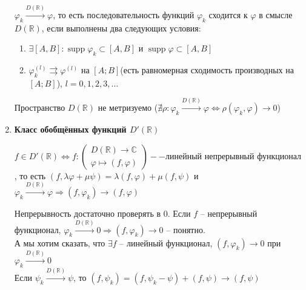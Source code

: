 \begin{enumerate}
    \begin{definition}
        $\varphi_k \overset{D(\mathbb{R})}{\longrightarrow} \varphi$, то есть последовательность функций $\varphi_k$ сходится к $\varphi$ в смысле $D(\mathbb{R})$, если выполнены два следующих условия: \begin{enumerate}
            \item $\exists [A, B]: \operatorname{supp} \varphi_k \subset [A, B]$ и $\operatorname{supp} \varphi \subset [A, B]$
            \item $\varphi_k^{(l)} \rightrightarrows \varphi^{(l)}$ на $[A;B]$(есть равномерная сходимость производных на $[A;B]$), $l = 0, 1, 2, 3, \dots$
        \end{enumerate}
    \end{definition}
    \begin{exercise}
        Пространство $D(\mathbb{R})$ не метризуемо ($\nexists \rho: \varphi_k \overset{D(\mathbb{R})}{\longrightarrow} \varphi \Leftrightarrow \rho(\varphi_k, \varphi) \to 0$)
    \end{exercise}
    \item \textbf{Класс обобщённых функций $D'(\mathbb{R})$}
        \begin{definition}
            $f \in D'(\mathbb{R}) \Leftrightarrow f:\begin{pmatrix}
            D(\mathbb{R}) \to \mathbb{C} \\ \varphi \mapsto (f, \varphi) 
            \end{pmatrix} -- \text{линейный непрерывный функционал }$, то есть $(f, \lambda \varphi + \mu \psi) = \lambda(f, \varphi) + \mu (f, \psi)$ и $\varphi_k \overset{D(\mathbb{R})}{\longrightarrow} \varphi \Longrightarrow (f, \varphi_k) \longrightarrow (f, \varphi)$
        \end{definition}
        \begin{warning}
            Непрерывность достаточно проверять в 0. Если $f$ -- непрерывный функционал, $\varphi_k \overset{D(\mathbb{R})}{\longrightarrow} 0 \Longrightarrow (f, \varphi_k) \longrightarrow 0$ -- понятно. \\ А мы хотим сказать, что $\exists f$ -- линейный функционал, $(f, \varphi_k) \longrightarrow 0$ при $\varphi_k \overset{D(\mathbb{R})}{\longrightarrow} 0$\\
            Если $\psi_k \overset{D(\mathbb{R})}{\longrightarrow} \psi$, то $(f, \psi_k) = (f, \psi_k - \psi) + (f, \psi) \longrightarrow (f, \psi)$
        \end{warning}
        \begin{example}

\end{example}
\end{enumerate}
